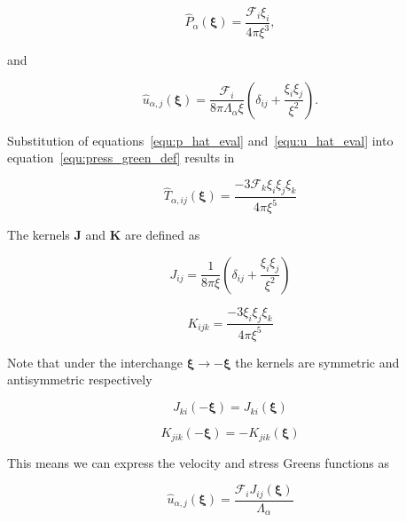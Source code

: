 \documentclass[12pt]{article}
\begin{document}
\begin{equation}
\label{equ:p_hat_eval}
\hat{P}_{\alpha} (\boldsymbol\xi) = \frac{\mathcal{F}_{i} \xi_{i}}{4 \pi \xi^{3}},
\end{equation}

and 

\begin{equation}
\label{equ:u_hat_eval}
\hat{u}_{\alpha,j}(\boldsymbol\xi) = \frac{\mathcal{F}_{i}}{8 \pi \Lambda_{\alpha} \xi} \left(\delta_{ij} + \frac{\xi_{i} \xi_{j}}{\xi^{2}} \right).
\end{equation}


Substitution of equations~\ref{equ:p_hat_eval} and~\ref{equ:u_hat_eval} into equation~\ref{equ:press_green_def} results in

\begin{equation}
\label{equ:green_stress}
\hat{T}_{\alpha, ij} (\boldsymbol\xi) = \frac{-3 \mathcal{F}_{k} \xi_{i} \xi_{j} \xi_{k}}{4 \pi \xi^{5}}
\end{equation}


The kernels $\boldsymbol{J}$ and $\boldsymbol{K}$ are defined as

\begin{equation}
\label{equ:j_kernel}
J_{ij} = \frac{1}{8 \pi \xi} \left(\delta_{ij} + \frac{\xi_{i} \xi_{j}}{\xi^{2}} \right)
\end{equation}

\begin{equation}
\label{equ:k_kernel}
K_{ijk} = \frac{-3 \xi_{i} \xi_{j} \xi_{k}}{4 \pi \xi^{5}}
\end{equation}

Note that under the interchange $\boldsymbol\xi \to -\boldsymbol\xi$ the kernels are symmetric and antisymmetric respectively

\begin{equation}
\label{equ:j_sym}
J_{ki}(-\boldsymbol\xi) = J_{ki}(\boldsymbol\xi)
\end{equation}

\begin{equation}
\label{equ:k_sym}
K_{jik}(-\boldsymbol\xi) = -K_{jik}(\boldsymbol\xi)
\end{equation}

This means we can express the velocity and stress Greens functions as

\begin{equation}
\label{equ:u_green}
\hat{u}_{\alpha,j}(\boldsymbol\xi) = \frac{\mathcal{F}_{i} J_{ij} (\boldsymbol\xi)}{\Lambda_{\alpha}}
\end{equation}
\end{document}
